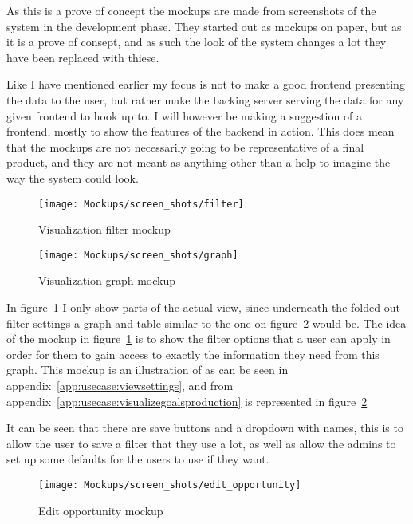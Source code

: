 As this is a prove of concept the mockups are made from screenshots of the
system in the development phase. They started out as mockups on paper, but as it
is a prove of consept, and as such the look of the system changes a lot they
have been replaced with thiese.

Like I have mentioned earlier my focus is not to make a good frontend presenting
the data to the user, but rather make the backing server serving the data for
any given frontend to hook up to. I will however be making a suggestion of a
frontend, mostly to show the features of the backend in action. This does
 mean that the mockups are not necessarily going to be representative of
a final product, and they are not meant as anything other than a help to
imagine the way the system could look. 

\begin{figure}[!htb]
  \centering
  \texttt{[image: Mockups/screen\_shots/filter]}
  \caption{Visualization filter mockup}
  \label{fig:VisualizationFilter}
\end{figure}

\begin{figure}[!htb]
  \centering
  \texttt{[image: Mockups/screen\_shots/graph]}
  \caption{Visualization graph mockup}
  \label{fig:VisualizationView}
\end{figure}

In figure~\ref{fig:VisualizationFilter} I only show parts  of the actual view,
since underneath the folded out filter settings a graph and table similar to the
one on figure~\ref{fig:VisualizationView} would be. The idea of the mockup in
figure~\ref{fig:VisualizationFilter} is to show the filter options that a user
can apply in order for them to gain access to exactly the information they need
from this graph. This mockup is an illustration of
 as can be seen in
appendix~\ref{app:usecase:viewsettings}, and
 from
appendix~\ref{app:usecase:visualizegoalsproduction} is represented in figure~\ref{fig:VisualizationView}

It can be seen that there are save buttons and a dropdown with names, this is to
allow the user to save a filter that they use a lot, as well as allow the admins
to set up some defaults for the users to use if they want.

\begin{figure}[!htb]
  \centering
  \texttt{[image: Mockups/screen\_shots/edit\_opportunity]}
  \caption{Edit opportunity mockup}
  \label{fig:OpportunityView}
\end{figure}

